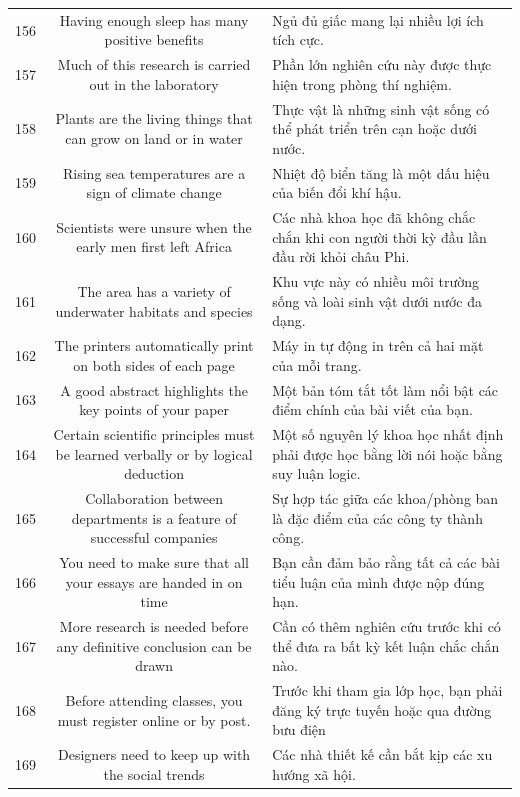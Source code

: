 \documentclass[11pt,a4paper]{article}
\begin{document}
\begin{longtable}{N S M}
156 & Having enough sleep has many positive benefits & Ngủ đủ giấc mang lại nhiều lợi ích tích cực. \\
157 & Much of this research is carried out in the laboratory & Phần lớn nghiên cứu này được thực hiện trong phòng thí nghiệm. \\
158 & Plants are the living things that can grow on land or in water & Thực vật là những sinh vật sống có thể phát triển trên cạn hoặc dưới nước. \\
159 & Rising sea temperatures are a sign of climate change & Nhiệt độ biển tăng là một dấu hiệu của biến đổi khí hậu. \\
160 & Scientists were unsure when the early men first left Africa & Các nhà khoa học đã không chắc chắn khi con người thời kỳ đầu lần đầu rời khỏi châu Phi. \\
161 & The area has a variety of underwater habitats and species & Khu vực này có nhiều môi trường sống và loài sinh vật dưới nước đa dạng. \\
162 & The printers automatically print on both sides of each page & Máy in tự động in trên cả hai mặt của mỗi trang. \\
163 & A good abstract highlights the key points of your paper & Một bản tóm tắt tốt làm nổi bật các điểm chính của bài viết của bạn. \\
164 & Certain scientific principles must be learned verbally or by logical deduction & Một số nguyên lý khoa học nhất định phải được học bằng lời nói hoặc bằng suy luận logic. \\
165 & Collaboration between departments is a feature of successful companies & Sự hợp tác giữa các khoa/phòng ban là đặc điểm của các công ty thành công. \\
166 & You need to make sure that all your essays are handed in on time & Bạn cần đảm bảo rằng tất cả các bài tiểu luận của mình được nộp đúng hạn. \\
167 & More research is needed before any definitive conclusion can be drawn & Cần có thêm nghiên cứu trước khi có thể đưa ra bất kỳ kết luận chắc chắn nào. \\
168 & Before attending classes, you must register online or by post. & Trước khi tham gia lớp học, bạn phải đăng ký trực tuyến hoặc qua đường bưu điện \\
169 & Designers need to keep up with the social trends & Các nhà thiết kế cần bắt kịp các xu hướng xã hội. \\

\end{longtable}
\end{document}
